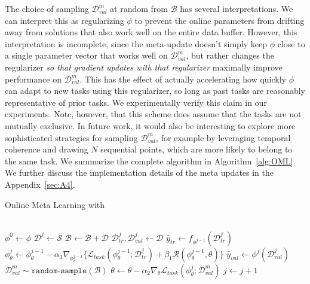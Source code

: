 The choice of sampling $\mathcal{D}_{val}^m$ at random from $\mathcal{B}$ has several interpretations. We can interpret this as regularizing $\phi$ to prevent the online parameters from drifting away from solutions that also work well on the entire data buffer. However, this interpretation is incomplete, since the meta-update doesn't simply keep $\phi$ close to a single parameter vector that works well on $\mathcal{D}_{val}^m$, but rather changes the regularizer \emph{so that gradient updates with that regularizer} maximally improve performance on $\mathcal{D}_{val}^m$. This has the effect of actually accelerating how quickly $\phi$ can adapt to new tasks using this regularizer, so long as past tasks are reasonably representative of prior tasks. We experimentally verify this claim in our experiments. Note, however, that this scheme does assume that the tasks are not mutually exclusive. In future work, it would also be interesting to explore more sophisticated strategies for sampling $\mathcal{D}_{val}^m$, for example by leveraging temporal coherence and drawing $N$ sequential points, which are more likely to belong to the same task. 
We summarize the complete algorithm in Algorithm~\ref{alg:OML}. We further discuss the implementation details of the meta updates in the Appendix~\ref{sec:A4}.


\begin{algorithm}[!h]
\caption{Online Meta Learning with \ours}
\label{alg:OML}
\begin{algorithmic}[1]
\\
\State $\phi^0 \gets \phi$  
    \State $\mathcal{D}^{j} \gets \mathcal{S} $  
    \State $\mathcal{B} \gets \mathcal{B} + \mathcal{D} $  
    \State $\mathcal{D}^j_{tr}, \mathcal{D}^j_{val} \gets \mathcal{D}$  
    \State $\hat{y}_{tr} \gets f_{\phi^{j-1}}(\mathcal{D}^j_{tr})$  
    \State $\phi^j_{\theta} \gets \phi^{j-1}_{\theta} - \alpha_1 \nabla_{\phi^{j-1}_{\theta}} \{ \mathcal{L}_{task} (\phi^{j-1}_{\theta}; \mathcal{D}^j_{tr})  + \beta_1 \mathcal{R}(\phi^{j-1}_{\theta}, \theta)\} $
    \State $\hat{y}_{val} \gets \phi^{j}(\mathcal{D}^j_{val})$ 
    \State $\mathcal{D}^m_{val} \sim \texttt{random-sample}(\mathcal{B}) $ 
    \State $\theta \gets \theta - \alpha_2 \nabla_{\theta}  \mathcal{L}_{task} (\phi^j_{\theta}; \mathcal{D}^m_{val})  $
    \State $j \gets j + 1$
\EndWhile
\EndProcedure
\end{algorithmic}
\end{algorithm}